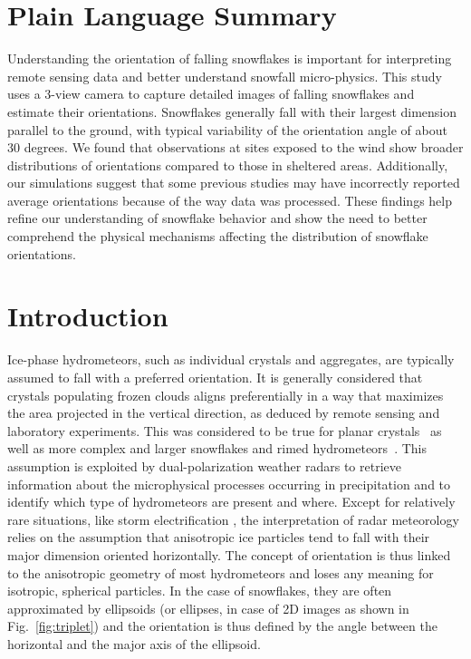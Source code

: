 \documentclass[draft]{agujournal2019}
\begin{document}
\section*{Plain Language Summary}
Understanding the orientation of falling snowflakes is important for interpreting remote sensing data and better understand snowfall micro-physics. This study uses a 3-view camera to capture detailed images of falling snowflakes and estimate their orientations. Snowflakes generally fall with their largest dimension parallel to the ground, with typical variability of the orientation angle of about 30 degrees. We found that observations at sites exposed to the wind show broader distributions of orientations compared to those in sheltered areas. Additionally, our simulations suggest that some previous studies may have incorrectly reported average orientations because of the way data was processed. These findings help refine our understanding of snowflake behavior and show the need to better comprehend the physical mechanisms affecting the distribution of snowflake orientations.


\section{Introduction}

Ice-phase hydrometeors, such as individual crystals and aggregates, are typically assumed to fall with a preferred orientation. It is generally considered that crystals populating frozen clouds aligns preferentially in a way that maximizes the area projected in the vertical direction, as deduced by remote sensing and laboratory experiments. This was considered to be true for planar crystals~\cite{Noel_JAMC_2005,Matrosov_JAS_2005,Tinklenberg_JFM_2024} as well as more complex and larger snowflakes and rimed hydrometeors~\cite{Kennedy_JAMC_2011, Ryzhkov_JAMC_2011, Koebschall_EF_2023}. 
This assumption is exploited by dual-polarization weather radars to retrieve information about the microphysical processes occurring in precipitation and to identify which type of hydrometeors are present and where. Except for relatively rare situations, like storm electrification \cite{Krehbiel_MAP_1996,Pineda_JGRA_2019}, the interpretation of radar meteorology relies on the assumption that anisotropic ice particles tend to fall with their major dimension oriented horizontally. The concept of orientation is thus linked to the anisotropic geometry of most hydrometeors and loses any meaning for isotropic, spherical particles. In the case of snowflakes, they are often approximated by ellipsoids (or ellipses, in case of 2D images as shown in Fig.~\ref{fig:triplet}) and the orientation is thus defined by the angle between the horizontal and the major axis of the ellipsoid.
\end{document}
